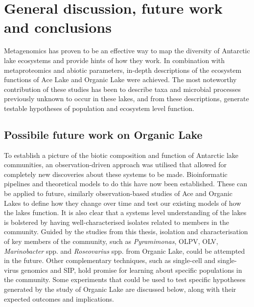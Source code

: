 \chapter{General discussion, future work and conclusions}
\label{ch:conc}
\acresetall

Metagenomics has proven to be an effective way to map the diversity of Antarctic lake ecosystems and provide hints of how they work.
In combination with metaproteomics and abiotic parameters, in-depth descriptions of the ecosystem functions of Ace Lake and Organic Lake were achieved.
The most noteworthy contribution of these studies has been to describe taxa and microbial processes previously unknown to occur in these lakes, and from these descriptions, generate testable hypotheses of population and ecosystem level function.
\section{Possibile future work on Organic Lake}
To establish a picture of the biotic composition and function of Antarctic lake communities, an observation-driven approach was utilised that allowed for completely new discoveries about these systems to be made.
Bioinformatic pipelines and theoretical models to do this have now been established.
These can be applied to future, similarly observation-based studies of Ace and Organic Lakes to define how they change over time and test our existing models of how the lakes function.
It is also clear that a systems level understanding of the lakes is bolstered by having well-characterised isolates related to members in the community.
Guided by the studies from this thesis, isolation and characterisation of key members of the community, such as \emph{Pyramimonas}, \ac{OLPV}, \ac{OLV}, \emph{Marinobacter} spp. and \emph{Roseovarius} spp. from Organic Lake, could be attempted in the future.
Other complementary techniques, such as single-cell and single-virus genomics and \ac{SIP}, hold promise for learning about specific populations in the community.
Some experiments that could be used to test specific hypotheses generated by the study of Organic Lake are discussed below, along with their expected outcomes and implications.

